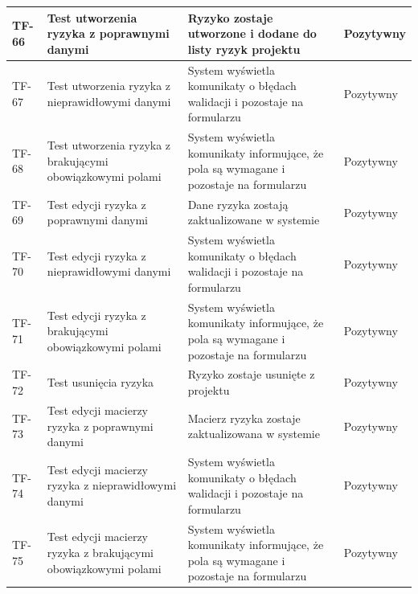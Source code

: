 \begin{longtable}{|p{2cm}|p{6cm}|p{5cm}|p{2.5cm}|}
TF-66 & Test utworzenia ryzyka z poprawnymi danymi & Ryzyko zostaje utworzone i dodane do listy ryzyk projektu & Pozytywny \\ \hline

TF-67 & Test utworzenia ryzyka z nieprawidłowymi danymi & System wyświetla komunikaty o błędach walidacji i pozostaje na formularzu & Pozytywny \\ \hline

TF-68 & Test utworzenia ryzyka z brakującymi obowiązkowymi polami & System wyświetla komunikaty informujące, że pola są wymagane i pozostaje na formularzu & Pozytywny \\ \hline

TF-69 & Test edycji ryzyka z poprawnymi danymi & Dane ryzyka zostają zaktualizowane w systemie & Pozytywny \\ \hline

TF-70 & Test edycji ryzyka z nieprawidłowymi danymi & System wyświetla komunikaty o błędach walidacji i pozostaje na formularzu & Pozytywny \\ \hline

TF-71 & Test edycji ryzyka z brakującymi obowiązkowymi polami & System wyświetla komunikaty informujące, że pola są wymagane i pozostaje na formularzu & Pozytywny \\ \hline

TF-72 & Test usunięcia ryzyka & Ryzyko zostaje usunięte z projektu & Pozytywny \\ \hline

TF-73 & Test edycji macierzy ryzyka z poprawnymi danymi & Macierz ryzyka zostaje zaktualizowana w systemie & Pozytywny \\ \hline

TF-74 & Test edycji macierzy ryzyka z nieprawidłowymi danymi & System wyświetla komunikaty o błędach walidacji i pozostaje na formularzu & Pozytywny \\ \hline

TF-75 & Test edycji macierzy ryzyka z brakującymi obowiązkowymi polami & System wyświetla komunikaty informujące, że pola są wymagane i pozostaje na formularzu & Pozytywny \\ \hline

\end{longtable}
